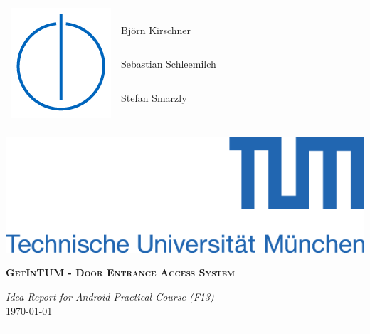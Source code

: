 \documentclass[a4paper,12pt]{article}
\begin{document}
\noindent %
\begin{minipage}{0.5\textwidth}
\begin{flushleft}

    \begin{tabular}{lm{6cm}}
\multirow{5}{*}{\includegraphics[scale=1]{images/IN_logo.png}} \\
 & Bj\"{o}rn Kirschner \\
 & Sebastian Schleemilch \\
 & Stefan Smarzly \\
 & \\
 & \\
\end{tabular}

\end{flushleft}
\end{minipage}
\hfill
\begin{minipage}{0.5\textwidth}
\begin{flushright}
   \includegraphics[scale=1]{images/tum_logo.png}
\end{flushright}
\end{minipage}

\begin{center}
{\LARGE\textbf{\textsc{GetInTUM - Door Entrance Access System}}}

\large \textit{Idea Report for Android Practical Course (F13)} \\
\large \today
\end{center}

\bigskip
\bigskip

\hrule
\bigskip
\bigskip
\end{document}
